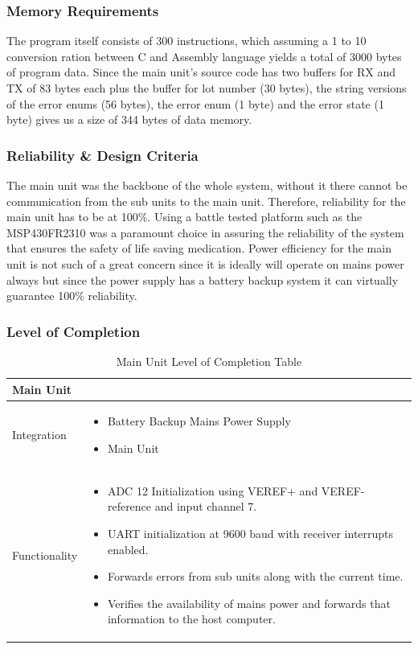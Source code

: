 \subsubsection{Memory Requirements}
The program itself consists of 300 instructions, which assuming a 1 to 10 conversion ration between C and Assembly language yields a total of 3000 bytes of program data. Since the main unit's source code has two buffers for RX and TX of 83 bytes each plus the buffer for lot number (30 bytes), the string versions of the error enums (56 bytes), the error enum (1 byte) and the error state (1 byte) gives us a size of 344 bytes of data memory.
\subsubsection{Reliability \& Design Criteria}
The main unit was the backbone of the whole system, without it there cannot be communication from the sub units to the main unit. Therefore, reliability for the main unit has to be at 100\%. Using a battle tested platform such as the MSP430FR2310 was a paramount choice in assuring the reliability of the system that ensures the safety of life saving medication. Power efficiency for the main unit is not such of a great concern since it is ideally will operate on mains power always but since the power supply has a battery backup system it can virtually guarantee 100\% reliability.
\subsubsection{Level of Completion}
\begin{landscape}
  \begin{table}[!ht]
    \begin{tabularx}{\textwidth}{|X|X|}
      \hline
      \multicolumn{2}{|X|}{Main Unit}\\
      \hline
      Integration&\begin{itemize}
                    \item Battery Backup Mains Power Supply
                    \item Main Unit
                  \end{itemize}\\
                  \hline
      Functionality&\begin{itemize}
          \item ADC 12 Initialization using VEREF+ and VEREF- reference and input channel 7.
          \item UART initialization at 9600 baud with receiver interrupts enabled.
          \item Forwards errors from sub units along with the current time.
          \item Verifies the availability of mains power and forwards that information to the host computer.
        \end{itemize}\\
      \hline
    \end{tabularx}
    \caption{Main Unit Level of Completion Table}
    \label{tab:main-unit-completion-table}
  \end{table}
\end{landscape}
